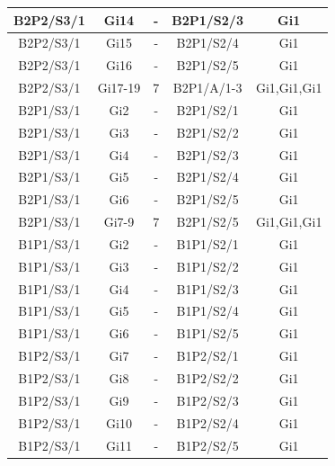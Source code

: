 \documentclass[a4paper,12pt]{extarticle}  %
\begin{document}
\begin{longtable}[c]{|c|c|c|c|c|}
	B2P2/S3/1 & Gi14    & - & B2P1/S2/3     & Gi1         \\ \hline %
	B2P2/S3/1 & Gi15    & - & B2P1/S2/4     & Gi1         \\ \hline %
	B2P2/S3/1 & Gi16    & - & B2P1/S2/5     & Gi1         \\ \hline %
	B2P2/S3/1 & Gi17-19 & 7 & B2P1/A/1-3    & Gi1,Gi1,Gi1 \\ \hline %
	B2P1/S3/1 & Gi2     & - & B2P1/S2/1     & Gi1         \\ \hline %
	B2P1/S3/1 & Gi3     & - & B2P1/S2/2     & Gi1         \\ \hline %
	B2P1/S3/1 & Gi4     & - & B2P1/S2/3     & Gi1         \\ \hline %
	B2P1/S3/1 & Gi5     & - & B2P1/S2/4     & Gi1         \\ \hline %
	B2P1/S3/1 & Gi6     & - & B2P1/S2/5     & Gi1         \\ \hline %
	B2P1/S3/1 & Gi7-9   & 7 & B2P1/S2/5     & Gi1,Gi1,Gi1 \\ \hline %
	B1P1/S3/1 & Gi2     & - & B1P1/S2/1     & Gi1         \\ \hline %
	B1P1/S3/1 & Gi3     & - & B1P1/S2/2     & Gi1         \\ \hline %
	B1P1/S3/1 & Gi4     & - & B1P1/S2/3     & Gi1         \\ \hline %
	B1P1/S3/1 & Gi5     & - & B1P1/S2/4     & Gi1         \\ \hline %
	B1P1/S3/1 & Gi6     & - & B1P1/S2/5     & Gi1         \\ \hline %
	B1P2/S3/1 & Gi7     & - & B1P2/S2/1     & Gi1         \\ \hline %
	B1P2/S3/1 & Gi8     & - & B1P2/S2/2     & Gi1         \\ \hline %
	B1P2/S3/1 & Gi9     & - & B1P2/S2/3     & Gi1         \\ \hline %
	B1P2/S3/1 & Gi10    & - & B1P2/S2/4     & Gi1         \\ \hline %
	B1P2/S3/1 & Gi11    & - & B1P2/S2/5     & Gi1         \\ \hline %

\end{longtable}
\end{document}
